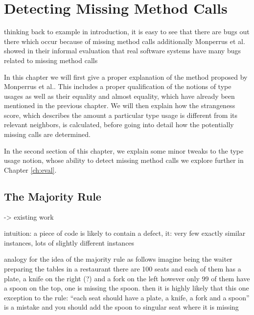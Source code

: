 \chapter{Detecting Missing Method Calls}\label{ch:dmmc}

thinking back to example in introduction, it is easy to see that there are bugs out there which occur because of missing method calls
additionally Monperrus et al. showed in their informal evaluation that real software systems have many bugs related to missing method calls

In this chapter we will first give a proper explanation of the method proposed by Monperrus et al..
This includes a proper qualification of the notions of type usages as well as their equality and almost equality, which have already been mentioned in the previous chapter.
We will then explain how the strangeness score, which describes the amount a particular type usage is different from its relevant neighbors, is calculated, before going into detail how the potentially missing calls are determined.

In the second section of this chapter, we explain some minor tweaks to the type usage notion, whose ability to detect missing method calls we explore further in Chapter \ref{ch:eval}.

\section{The Majority Rule}
-> existing work

intuition:
a piece of code is likely to contain a defect, it: very few exactly similar instances, lots of slightly different instances

analogy for the idea of the majority rule as follows
imagine being the waiter preparing the tables in a restaurant
there are 100 seats and each of them has a plate, a knife on the right (?) and a fork on the left
however only 99 of them have a spoon on the top,
one is missing the spoon.
then it is highly likely that this one exception to the rule: ``each seat should have a plate, a knife, a fork and a spoon''
is a mistake and you should add the spoon to singular seat where it is missing

